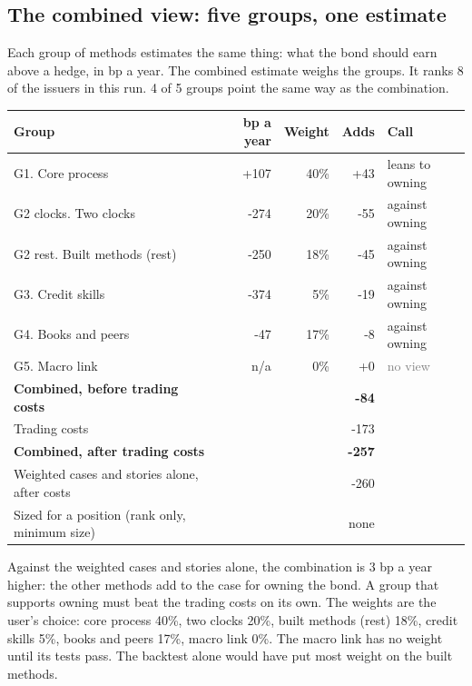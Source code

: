 \documentclass[11pt,a4paper]{article}
\begin{document}
\subsection*{The combined view: five groups, one estimate}
Each group of methods estimates the same thing: what the bond should earn above a hedge, in bp a year. The combined estimate weighs the groups. It ranks 8 of the issuers in this run. 4 of 5 groups point the same way as the combination.
\begin{center}\footnotesize\setlength{\tabcolsep}{3.5pt}\begin{tabular}{@{}lrrrl@{}}\toprule
Group & bp a year & Weight & Adds & Call \\\midrule
G1. Core process & +107 & 40\% & +43 & \textcolor{amber}{leans to owning} \\
G2 clocks. Two clocks & -274 & 20\% & -55 & \textcolor{bad}{against owning} \\
G2 rest. Built methods (rest) & -250 & 18\% & -45 & \textcolor{bad}{against owning} \\
G3. Credit skills & -374 & 5\% & -19 & \textcolor{bad}{against owning} \\
G4. Books and peers & -47 & 17\% & -8 & \textcolor{bad}{against owning} \\
G5. Macro link & n/a & 0\% & +0 & \textcolor{gray}{no view} \\
\textbf{Combined, before trading costs} &  &  & \textbf{-84} &  \\
Trading costs &  &  & -173 &  \\
\textbf{Combined, after trading costs} &  &  & \textbf{-257} &  \\
Weighted cases and stories alone, after costs &  &  & -260 &  \\
Sized for a position (rank only, minimum size) &  &  & none &  \\
\bottomrule\end{tabular}\end{center}
Against the weighted cases and stories alone, the combination is 3 bp a year higher: the other methods add to the case for owning the bond. A group that supports owning must beat the trading costs on its own. The weights are the user's choice: core process 40\%, two clocks 20\%, built methods (rest) 18\%, credit skills 5\%, books and peers 17\%, macro link 0\%. The macro link has no weight until its tests pass. The backtest alone would have put most weight on the built methods.
\par\noindent{}
\end{document}
